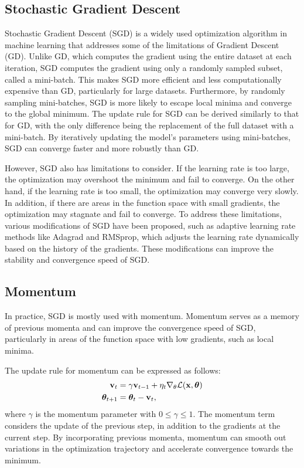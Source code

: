 \subsection{Stochastic Gradient Descent}
Stochastic Gradient Descent (SGD) is a widely used optimization algorithm in machine learning that addresses some of the limitations of Gradient Descent (GD).
Unlike GD, which computes the gradient using the entire dataset at each iteration, SGD computes the gradient using only a randomly sampled subset, called a mini-batch.
This makes SGD more efficient and less computationally expensive than GD, particularly for large datasets.
Furthermore, by randomly sampling mini-batches, SGD is more likely to escape local minima and converge to the global minimum.
The update rule for SGD can be derived similarly to that for GD, with the only difference being the replacement of the full dataset with a mini-batch.
By iteratively updating the model's parameters using mini-batches, SGD can converge faster and more robustly than GD.

However, SGD also has limitations to consider. If the learning rate is too large, the optimization may overshoot the minimum and fail to converge.
On the other hand, if the learning rate is too small, the optimization may converge very slowly.
In addition, if there are areas in the function space with small gradients, the optimization may stagnate and fail to converge.
To address these limitations, various modifications of SGD have been proposed, such as adaptive learning rate methods like Adagrad and RMSprop,
which adjusts the learning rate dynamically based on the history of the gradients.
These modifications can improve the stability and convergence speed of SGD.


\subsection{Momentum}

In practice, SGD is mostly used with momentum.
Momentum serves as a memory of previous momenta and can improve the convergence speed of SGD, particularly in areas of the function space with low gradients, such as local minima.

The update rule for momentum can be expressed as follows:
\begin{align}
\bold{v}_t &= \gamma \bold{v}_{t-1} + \eta_t \nabla_\theta \mathcal{L}(\bold{x}, \boldsymbol{\theta}) \\
\boldsymbol{\theta}_{t+1} &= \boldsymbol{\theta}_t - \bold{v}_t,
\end{align}
where $\gamma$ is the momentum parameter with $0 \leq \gamma \leq 1$.
The momentum term considers the update of the previous step, in addition to the gradients at the current step.
By incorporating previous momenta, momentum can smooth out variations in the optimization trajectory and accelerate convergence towards the minimum.

